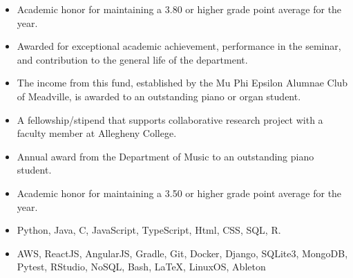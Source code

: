 \documentclass[10pt,a4paper,ragged2e]{altacv}
\begin{document}
\begin{itemize}
\item Academic honor for maintaining a 3.80 or higher grade point average for the year.
\end{itemize} 
\smallskip
{}
\begin{itemize}
\item Awarded for exceptional academic achievement, performance in the seminar, and contribution to the general life of the department.
\end{itemize} 
\smallskip
{}
\begin{itemize}
\item The income from this fund, established by the Mu Phi Epsilon Alumnae Club of Meadville, is awarded to an outstanding piano or organ student. 
\end{itemize} 
\smallskip
{}
\begin{itemize}
\item A fellowship/stipend that supports collaborative research project with a faculty member at Allegheny College.
\end{itemize} 
\smallskip
{}
\begin{itemize}
\item Annual award from the Department of Music to an outstanding piano student.
\end{itemize} 
\smallskip
{}
\begin{itemize}
\item Academic honor for maintaining a 3.50 or higher grade point average for the year.
\end{itemize} 

\begin{itemize}
\item Python, Java, C, JavaScript, TypeScript, Html, CSS, SQL, R.
\item AWS, ReactJS, AngularJS, Gradle, Git, Docker, Django, SQLite3, MongoDB, Pytest, RStudio, NoSQL, Bash, \LaTeX, LinuxOS, Ableton
\end{itemize}





\end{document}

